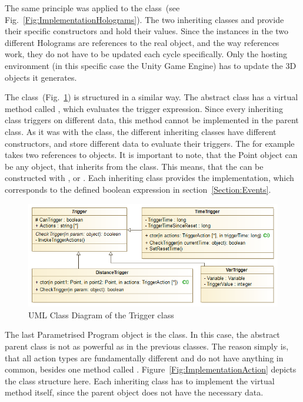 The same principle was applied to the  class~(see Fig.~\ref{Fig:ImplementationHolograms}). The two inheriting classes  and  provide their specific constructors and hold their values. Since the  instances in the two different Holograms are references to the real  object, and the way references work, they do not have to be updated each cycle specifically. Only the hosting environment (in this specific case the Unity Game Engine) has to update the 3D objects it generates. 

The  class~(Fig.~\ref{Fig:ImplementationTriggers}) is structured in a similar way.  The abstract class  has a virtual method called , which evaluates the trigger expression. Since every inheriting class triggers on different data, this method cannot be implemented in the parent class. As it was with the  class, the different inheriting classes have different constructors, and store different data to evaluate their triggers. The  for example takes two references to  objects. It is important to note, that the Point object can be any object, that inherits from the  class. This means, that the  can be constructed with ,  or . Each inheriting class provides the  implementation, which corresponds to the defined boolean expression in section~\ref{Section:Events}.

\begin{figure}[!h]
	\centering
	\includegraphics[width=0.7\linewidth]{Figures/Implementation_Triggers}
	\caption{UML Class Diagram of the Trigger class}
	\label{Fig:ImplementationTriggers}
\end{figure}

The last Parametrised Program object is the  class. In this case, the abstract parent class is not as powerful as in the previous classes. The reason simply is, that all action types are fundamentally different and do not have anything in common, besides one method called . Figure~\ref{Fig:ImplementationAction} depicts the class structure here. Each inheriting class has to implement the virtual  method itself, since the parent object does not have the necessary data.

